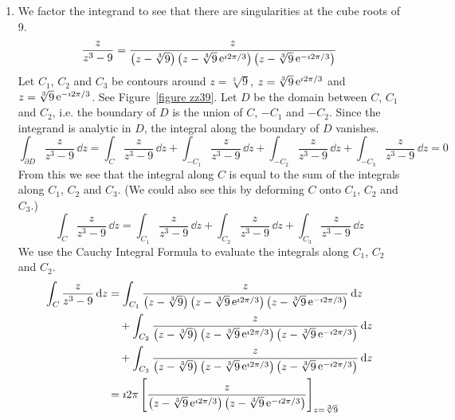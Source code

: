 {\begin{Solution}
  \begin{enumerate}
  \item 
    We factor the integrand to see that there are singularities at 
    the cube roots of $9$.
    \[
    \frac{z}{z^3 - 9} = \frac{z}{\left( z - \sqrt[3]{9} \right)
      \left( z - \sqrt[3]{9} \mathop{\mathrm{e}}\nolimits^{\imath 2 \pi/3} \right)
      \left( z - \sqrt[3]{9} \mathop{\mathrm{e}}\nolimits^{-\imath 2 \pi/3} \right) }
    \]
    Let $C_1$, $C_2$ and $C_3$ be contours around $z = \sqrt[3]{9}$,
    $z = \sqrt[3]{9} \mathop{\mathrm{e}}\nolimits^{\imath 2 \pi/3}$ and $z = \sqrt[3]{9} \mathop{\mathrm{e}}\nolimits^{-\imath 2 \pi/3}$.  See 
    Figure~\ref{figure zz39}.  Let $D$ be the domain between $C$, $C_1$ and
    $C_2$, i.e. the boundary of $D$ is the union of $C$, $-C_1$ and $-C_2$.
    Since the integrand is analytic in $D$, the integral along the boundary
    of $D$ vanishes.
    \[
    \int_{\partial D} \frac{z}{z^3 - 9}\,\dd z
    = \int_{C} \frac{z}{z^3 - 9}\,\dd z
    + \int_{-C_1} \frac{z}{z^3 - 9}\,\dd z
    + \int_{-C_2} \frac{z}{z^3 - 9}\,\dd z
    + \int_{-C_3} \frac{z}{z^3 - 9}\,\dd z = 0
    \]
    From this we see that the integral along $C$ is equal to the sum of 
    the integrals along $C_1$, $C_2$ and $C_3$.  (We could also see this by deforming
    $C$ onto $C_1$, $C_2$ and $C_3$.)
    \[
    \int_{C} \frac{z}{z^3 - 9}\,\dd z = 
    \int_{C_1} \frac{z}{z^3 - 9}\,\dd z
    + \int_{C_2} \frac{z}{z^3 - 9}\,\dd z
    + \int_{C_3} \frac{z}{z^3 - 9}\,\dd z
    \]
    We use the Cauchy Integral Formula to evaluate the integrals along
    $C_1$, $C_2$ and $C_2$.
    \begin{align*}
      \int_C \frac{z}{z^3 - 9}\,\dd z
      &= \int_{C_1} \frac{z}{\left( z - \sqrt[3]{9} \right)
        \left( z - \sqrt[3]{9} \e^{\imath 2 \pi/3} \right)
        \left( z - \sqrt[3]{9} \e^{-\imath 2 \pi/3} \right) }\,\dd z
      \\
      &\quad + \int_{C_2} \frac{z}{\left( z - \sqrt[3]{9} \right)
        \left( z - \sqrt[3]{9} \e^{\imath 2 \pi/3} \right)
        \left( z - \sqrt[3]{9} \e^{-\imath 2 \pi/3} \right) }\,\dd z
      \\
      &\quad + \int_{C_3} \frac{z}{\left( z - \sqrt[3]{9} \right)
        \left( z - \sqrt[3]{9} \e^{\imath 2 \pi/3} \right)
        \left( z - \sqrt[3]{9} \e^{-\imath 2 \pi/3} \right) }\,\dd z
      \\
      &= \imath 2 \pi \left[ \frac{z}{
          \left( z - \sqrt[3]{9} \e^{\imath 2 \pi/3} \right)
          \left( z - \sqrt[3]{9} \e^{-\imath 2 \pi/3} \right) } \right]_{z = \sqrt[3]{9}}
      \\

\end{align*}
\end{enumerate}
\end{Solution}}
